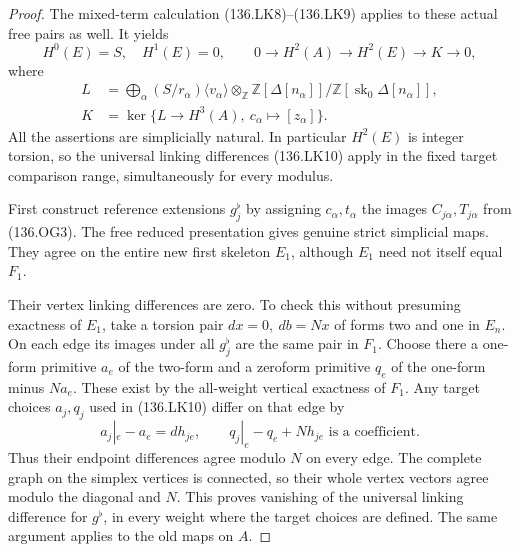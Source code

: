 \begin{proof}
The mixed-term calculation (136.LK8)--(136.LK9) applies to
these actual free pairs as well.  It yields
\[
 H^0(E)=S,\quad H^1(E)=0,\qquad
 0\longrightarrow H^2(A)\longrightarrow H^2(E)
                         \longrightarrow K\longrightarrow0,
                                                               \tag{136.OG5}
\]
where
\[
 \begin{split}
 L&=\bigoplus_\alpha(S/r_\alpha)\langle v_\alpha\rangle
       \otimes_{\mathbb Z}
       \mathbb Z[\Delta[n_\alpha]]/
                         \mathbb Z[\operatorname{sk}_0\Delta[n_\alpha]],\\
 K&=\ker\{L\longrightarrow H^3(A),\ c_\alpha\longmapsto[z_\alpha]\}.
 \end{split}                                                \tag{136.OG6}
\]
All the assertions are simplicially natural.  In particular
\(H^2(E)\) is integer torsion, so the universal linking
differences (136.LK10) apply in the fixed target comparison
range, simultaneously for every modulus.

First construct reference extensions \(g_j^\flat\) by
assigning \(c_\alpha,t_\alpha\) the images
\(C_{j\alpha},T_{j\alpha}\) from (136.OG3).  The free
reduced presentation gives genuine strict simplicial maps.
They agree on the entire new first skeleton \(E_1\),
although \(E_1\) need not itself equal \(F_1\).

Their vertex linking differences are zero.  To check this
without presuming exactness of \(E_1\), take a torsion pair
\(dx=0,\ db=Nx\) of forms two and one in \(E_n\).
On each edge its images under all \(g_j^\flat\) are the
same pair in \(F_1\).  Choose there a one-form primitive
\(a_e\) of the two-form and a zeroform primitive \(q_e\)
of the one-form minus \(Na_e\).  These exist by the
all-weight vertical exactness of \(F_1\).
Any target choices \(a_j,q_j\) used in (136.LK10) differ
on that edge by
\[
             a_j|_e-a_e=dh_{je},\qquad
             q_j|_e-q_e+Nh_{je}\text{ is a coefficient}.
                                                               \tag{136.OG7}
\]
Thus their endpoint differences agree modulo \(N\) on
every edge.  The complete graph on the simplex vertices is
connected, so their whole vertex vectors agree modulo the
diagonal and \(N\).  This proves vanishing of the universal
linking difference for \(g^\flat\), in every weight where
the target choices are defined.  The same argument applies
to the old maps on \(A\).


\end{proof}
